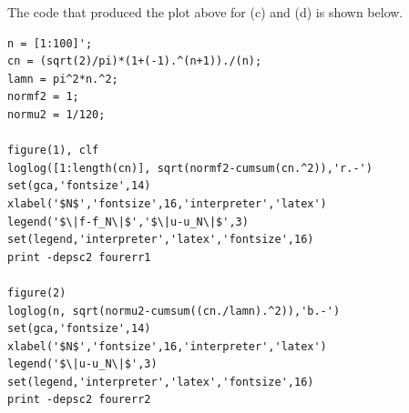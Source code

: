 \begin{solution}
\begin{enumerate}
The code that produced the plot above for (c) and (d) is shown below.

{\small \begin{verbatim}
n = [1:100]';
cn = (sqrt(2)/pi)*(1+(-1).^(n+1))./(n);
lamn = pi^2*n.^2;
normf2 = 1;
normu2 = 1/120;

figure(1), clf
loglog([1:length(cn)], sqrt(normf2-cumsum(cn.^2)),'r.-')
set(gca,'fontsize',14)
xlabel('$N$','fontsize',16,'interpreter','latex')
legend('$\|f-f_N\|$','$\|u-u_N\|$',3)
set(legend,'interpreter','latex','fontsize',16)
print -depsc2 fourerr1

figure(2)
loglog(n, sqrt(normu2-cumsum((cn./lamn).^2)),'b.-')
set(gca,'fontsize',14)
xlabel('$N$','fontsize',16,'interpreter','latex')
legend('$\|u-u_N\|$',3)
set(legend,'interpreter','latex','fontsize',16)
print -depsc2 fourerr2
\end{verbatim}}
%
%
%
%
%
%
%

\end{enumerate}

\end{solution}
